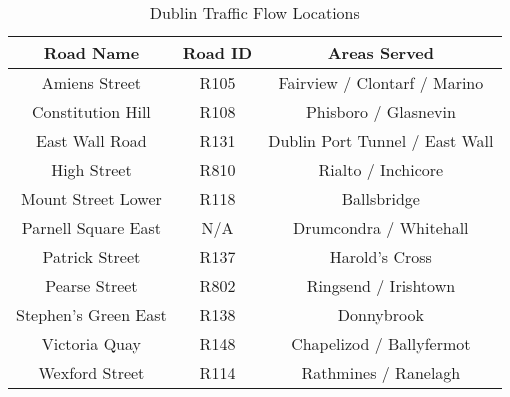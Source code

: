 \begin{table}[H]
    \begin{center}
        \begin{tabular}{||c c c||} 
            \hline
            Road Name & Road ID & Areas Served\\ [0.5ex] 
            \hline\hline
            Amiens Street & R105 & Fairview / Clontarf / Marino\\ 
            \hline
            Constitution Hill & R108 & Phisboro / Glasnevin\\
            \hline
            East Wall Road & R131 & Dublin Port Tunnel / East Wall \\
            \hline
            High Street & R810 & Rialto / Inchicore \\
            \hline
            Mount Street Lower & R118 & Ballsbridge \\
            \hline
            Parnell Square East & N/A & Drumcondra / Whitehall \\
            \hline
            Patrick Street & R137 & Harold's Cross \\
            \hline
            Pearse Street & R802 & Ringsend / Irishtown \\
            \hline
            Stephen's Green East & R138 & Donnybrook \\
            \hline
            Victoria Quay & R148 & Chapelizod / Ballyfermot \\
            \hline
            Wexford Street & R114 & Rathmines / Ranelagh \\ [1ex]
            \hline
        \end{tabular}
        \caption{Dublin Traffic Flow Locations}
        \label{table:trafficflow}
    \end{center}
\end{table}